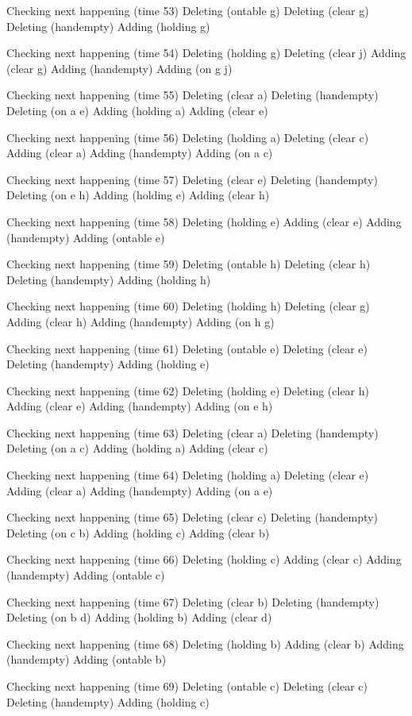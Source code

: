 Checking next happening (time 53)
Deleting (ontable g)
Deleting (clear g)
Deleting (handempty)
Adding (holding g)

Checking next happening (time 54)
Deleting (holding g)
Deleting (clear j)
Adding (clear g)
Adding (handempty)
Adding (on g j)

Checking next happening (time 55)
Deleting (clear a)
Deleting (handempty)
Deleting (on a e)
Adding (holding a)
Adding (clear e)

Checking next happening (time 56)
Deleting (holding a)
Deleting (clear c)
Adding (clear a)
Adding (handempty)
Adding (on a c)

Checking next happening (time 57)
Deleting (clear e)
Deleting (handempty)
Deleting (on e h)
Adding (holding e)
Adding (clear h)

Checking next happening (time 58)
Deleting (holding e)
Adding (clear e)
Adding (handempty)
Adding (ontable e)

Checking next happening (time 59)
Deleting (ontable h)
Deleting (clear h)
Deleting (handempty)
Adding (holding h)

Checking next happening (time 60)
Deleting (holding h)
Deleting (clear g)
Adding (clear h)
Adding (handempty)
Adding (on h g)

Checking next happening (time 61)
Deleting (ontable e)
Deleting (clear e)
Deleting (handempty)
Adding (holding e)

Checking next happening (time 62)
Deleting (holding e)
Deleting (clear h)
Adding (clear e)
Adding (handempty)
Adding (on e h)

Checking next happening (time 63)
Deleting (clear a)
Deleting (handempty)
Deleting (on a c)
Adding (holding a)
Adding (clear c)

Checking next happening (time 64)
Deleting (holding a)
Deleting (clear e)
Adding (clear a)
Adding (handempty)
Adding (on a e)

Checking next happening (time 65)
Deleting (clear c)
Deleting (handempty)
Deleting (on c b)
Adding (holding c)
Adding (clear b)

Checking next happening (time 66)
Deleting (holding c)
Adding (clear c)
Adding (handempty)
Adding (ontable c)

Checking next happening (time 67)
Deleting (clear b)
Deleting (handempty)
Deleting (on b d)
Adding (holding b)
Adding (clear d)

Checking next happening (time 68)
Deleting (holding b)
Adding (clear b)
Adding (handempty)
Adding (ontable b)

Checking next happening (time 69)
Deleting (ontable c)
Deleting (clear c)
Deleting (handempty)
Adding (holding c)

